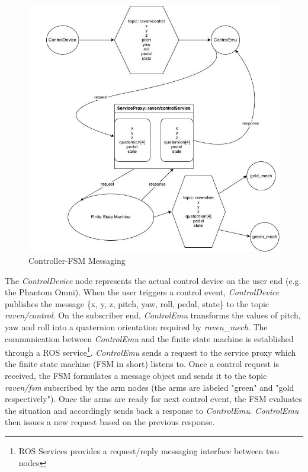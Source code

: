 \documentclass[letterpaper,twocolumn,10pt]{article}
\begin{document}
\begin{figure}[h]
  \includegraphics[scale=0.33]{ControlDiagram.jpg}
  \caption{Controller-FSM Messaging}
  \label{fig:control_diagram}
\end{figure}

The \emph{ControlDevice} node represents the actual control device on
the user end (e.g. the Phantom Omni). When the user triggers a control
event, \emph{ControlDevice} publishes the message \{x, y, z, pitch,
yaw, roll, pedal, state\} to the topic \emph{raven/control}. On the
subscriber end, \emph{ControlEmu} transforms the values of pitch, yaw
and roll into a quaternion orientation required by
\emph{raven\_mech}. The communication between \emph{ControlEmu} and
the finite state machine is established through a ROS
service\footnote{ROS Services provides a request/reply messaging
  interface between two nodes}. \emph{ControlEmu} sends a request to
the service proxy which the finite state machine (FSM in short)
listens to. Once a control request is received, the FSM formulates a
message object and sends it to the topic \emph{raven/fsm} subscribed
by the arm nodes (the arms are labeled "green" and "gold
respectively"). Once the arms are ready for next control event, the
FSM evaluates the situation and accordingly sends back a response to
\emph{ControlEmu}. \emph{ControlEmu} then issues a new request based
on the previous response.
\end{document}
